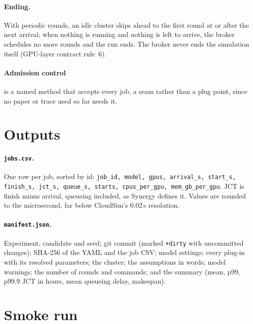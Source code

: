 \documentclass[11pt,a4paper]{article}
\newcommand{\code}[1]{\texttt{#1}}
\begin{document}
\paragraph{Ending.} With periodic rounds, an idle cluster skips ahead to the first round at or after
the next arrival; when nothing is running and nothing is left to arrive, the broker schedules no more
rounds and the run ends. The broker never ends the simulation itself (GPU-layer contract rule~6).

\paragraph{Admission control} is a named method that accepts every job, a seam rather than a plug
point, since no paper or trace used so far needs it.

\section{Outputs}

\paragraph{\code{jobs.csv}.} One row per job, sorted by id:
\code{job\_id, model, gpus, arrival\_s, start\_s, finish\_s, jct\_s, queue\_s, starts, cpus\_per\_gpu,
mem\_gb\_per\_gpu}. JCT is finish minus arrival, queueing included, as Synergy defines it. Values are
rounded to the microsecond, far below CloudSim's 0.02\,s resolution.

\paragraph{\code{manifest.json}.} Experiment, candidate and seed; git commit (marked \code{+dirty}
with uncommitted changes); SHA-256 of the YAML and the job CSV; model settings; every plug-in with its
resolved parameters; the cluster; the assumptions in words; model warnings; the number of rounds and
commands; and the summary (mean, p99, p99.9 JCT in hours, mean queueing delay, makespan).

\section{Smoke run}
\end{document}
